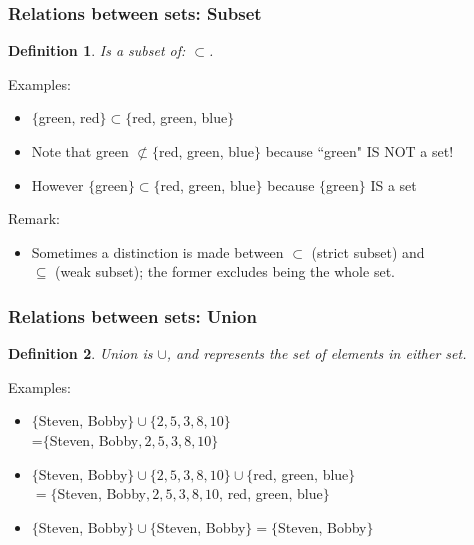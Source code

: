 \documentclass[aspectratio=169]{beamer}
\newtheorem{defn}{Definition}
\numberwithin{equation}{section}
\begin{document}
\begin{frame}
\frametitle{Relations between sets: Subset}

\begin{defn}
Is a subset of: $\subset$.
\end{defn}
\pause

{Examples: }
\begin{itemize}
\item $\{$green, red$\} \subset \{$red, green, blue$\}$ \pause
\item Note that green $\not\subset \{$red, green, blue$\}$ because ``green" IS NOT a set! \pause
\item However $\{$green$\}\subset \{$red, green, blue$\}$ because $\{$green$\}$ IS a set \pause
\end{itemize}

{Remark: }
\begin{itemize}
\item Sometimes a distinction is made between $\subset$ (strict subset) and \\ $\subseteq$ (weak subset); the former excludes being the whole set.
\end{itemize}

\end{frame}



\begin{frame}
\frametitle{Relations between sets: Union}

\begin{defn}
Union is $\cup$, and represents the set of elements in \textit{either} set.
\end{defn}
\pause

{Examples: }
\begin{itemize}
\item $\{$Steven, Bobby$\} \cup \{2, 5, 3, 8, 10\}$ \\ =$\{$Steven, Bobby$, 2, 5, 3, 8, 10\}$ \pause
\item $\{$Steven, Bobby$\} \cup \{2, 5, 3, 8, 10\} \cup \{$red, green, blue$\}$ \\ $=\{$Steven, Bobby$, 2, 5, 3, 8, 10$, red, green, blue$\}$ \pause
\item $\{$Steven, Bobby$\} \cup \{$Steven, Bobby$\} =\{$Steven, Bobby$\}$
\end{itemize}

\end{frame}
\end{document}
